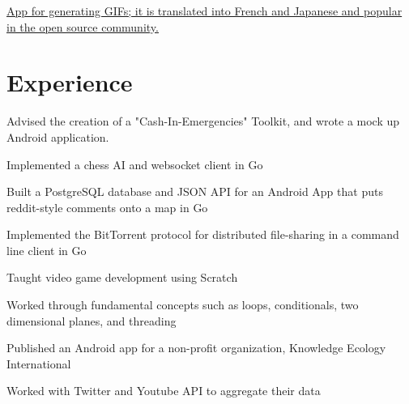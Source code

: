 \documentclass[]{deedy-resume-openfont}
\begin{document}
\href{https://github.com/polypmer/fissure-android}{App for generating GIFs; it is translated into French and Japanese and popular in the open source community.}



\section{Experience}
\begin{tightemize}
\item Advised the creation of a "Cash-In-Emergencies" Toolkit, and wrote a mock up Android application.
\end{tightemize}
\sectionsep

\begin{tightemize}
\item Implemented a chess AI and websocket client in Go
\item Built a PostgreSQL database and JSON API for an Android App that puts reddit-style comments onto a map in Go
\item Implemented the BitTorrent protocol for distributed file-sharing in a command line client in Go
\end{tightemize}
\sectionsep

\begin{tightemize}
\item Taught video game development using Scratch
\item Worked through fundamental concepts such as loops, conditionals, two dimensional planes, and threading
\end{tightemize}
\sectionsep

\begin{tightemize}
\item Published an Android app for a non-profit organization, Knowledge Ecology International
\item Worked with Twitter and Youtube API to aggregate their data
\end{tightemize}
\sectionsep
\end{document}
